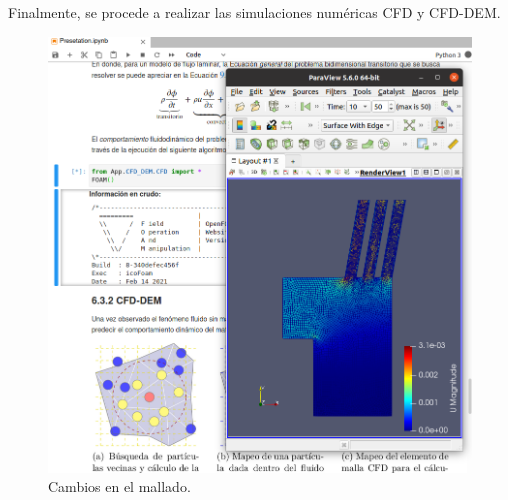 \newpage

\noindent
\justify

Finalmente, se procede a realizar las simulaciones num\'ericas CFD y CFD-DEM.

\begin{figure}[h!]
	\centering
	\includegraphics[width=\textwidth]{Images/Anexos/12.png}
	\caption{Cambios en el mallado.}
	\label{CamMallaSoft}
\end{figure}